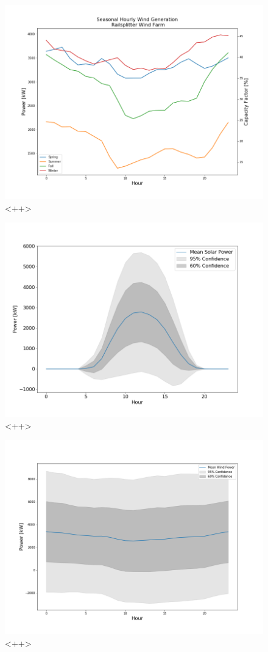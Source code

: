\begin{figure}[ht]
	\centering
	\includegraphics[width=\columnwidth]{./img/cap/seasonal_hourly_wind.png}
	\caption{<++>}
	\label{fig:<++>}
\end{figure}

\begin{figure}[ht]
	\centering
	\includegraphics[width=\columnwidth]{./img/cap/solar_mean.png}
	\caption{<++>}
	\label{fig:<++>}
\end{figure}

\begin{figure}[ht]
	\centering
	\includegraphics[width=\columnwidth]{./img/cap/wind_mean.png}
        \caption{<++>}
	\label{fig:<++>}
\end{figure}
